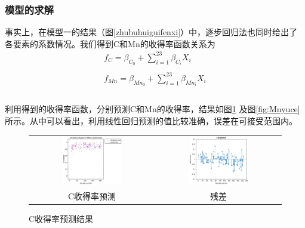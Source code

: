 \documentclass[12pt]{article}%
\begin{document}
\subsubsection{模型的求解}
事实上，在模型一的结果（图\ref{zhubuhuiguifenxi}）中，逐步回归法也同时给出了各要素的系数情况。我们得到C和Mn的收得率函数关系为
\begin{equation}\label{chemnxianxing}
\begin{array}{c}
 f_C=\beta_{C_0}+\sum_{i=1}^{23} \beta_{C_i}X_i\\
 \\
 f_{Mn}=\beta_{Mn_0}+\sum_{i=1}^{23} \beta_{Mn_i}X_i\\
 \end{array}
\end{equation}\\
利用得到的收得率函数，分别预测C和Mn的收得率，结果如图\ref{fig:Cyuce}
及图\ref{fig:Mnyuce}
所示。从中可以看出，利用线性回归预测的值比较准确，误差在可接受范围内。
\begin{figure}[htbp]
  \centering
  \begin{tabular}{cc}
  \includegraphics[width=0.5\textwidth]{picture/C_wuxiangduiwucha} & \includegraphics[width=0.5\textwidth]{picture/C_cancha} \\
    C收得率预测 & 残差 \\
  \end{tabular}
  \caption{C收得率预测结果}\label{fig:Cyuce}
\end{figure}
\end{document}

